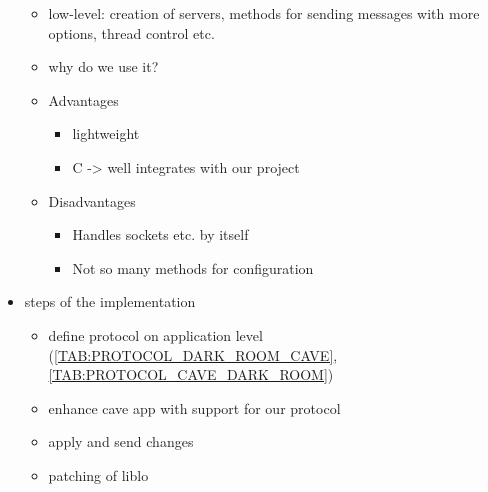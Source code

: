 \documentclass[conference]{acmsiggraph}
\begin{document}
\begin{itemize}
{\begin{itemize}
{\begin{itemize}
			\item low-level: creation of servers, methods for sending messages with more options, thread control etc.
			\item why do we use it?
			\item{
				Advantages
				\begin{itemize}
					\item lightweight
					\item C -> well integrates with our project
				\end{itemize}
			}
			\item{
				Disadvantages
				\begin{itemize}
					\item Handles sockets etc. by itself
					\item Not so many methods for configuration
				\end{itemize}
			}
		\end{itemize}
	}
	\end{itemize}
}
\item{
	steps of the implementation
	\begin{itemize}
		\item define protocol on application level (\cref{TAB:PROTOCOL_DARK_ROOM_CAVE}, \cref{TAB:PROTOCOL_CAVE_DARK_ROOM})
		\item enhance cave app with support for our protocol
		\item apply and send changes
		\item patching of liblo
	\end{itemize}
}
\end{itemize}
\end{document}
